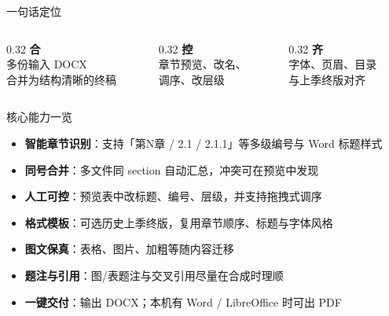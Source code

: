 \documentclass[aspectratio=169,10pt,UTF8]{ctexbeamer}
\begin{document}
\begin{frame}{一句话定位}
  \vspace{1.2em}
  \begin{center}
  \end{center}
  \vspace{1.2em}
  \begin{columns}[T]
    \begin{column}{0.32\textwidth}
      \centering
      {\color{BrandAccent}\Large\bfseries 合}\\[0.3em]
      多份输入 DOCX\\合并为结构清晰的终稿
    \end{column}
    \begin{column}{0.32\textwidth}
      \centering
      {\color{BrandAccent}\Large\bfseries 控}\\[0.3em]
      章节预览、改名、\\调序、改层级
    \end{column}
    \begin{column}{0.32\textwidth}
      \centering
      {\color{BrandAccent}\Large\bfseries 齐}\\[0.3em]
      字体、页眉、目录\\与上季终版对齐
    \end{column}
  \end{columns}
\end{frame}

\begin{frame}{核心能力一览}
  \begin{itemize}
    \item \textbf{智能章节识别}：支持「第N章 / 2.1 / 2.1.1」等多级编号与 Word 标题样式
    \item \textbf{同号合并}：多文件同 section 自动汇总，冲突可在预览中发现
    \item \textbf{人工可控}：预览表中改标题、编号、层级，并支持拖拽式调序
    \item \textbf{格式模板}：可选历史上季终版，复用章节顺序、标题与字体风格
    \item \textbf{图文保真}：表格、图片、加粗等随内容迁移
    \item \textbf{题注与引用}：图/表题注与交叉引用尽量在合成时理顺
    \item \textbf{一键交付}：输出 DOCX；本机有 Word / LibreOffice 时可出 PDF
  \end{itemize}
\end{frame}
\end{document}

